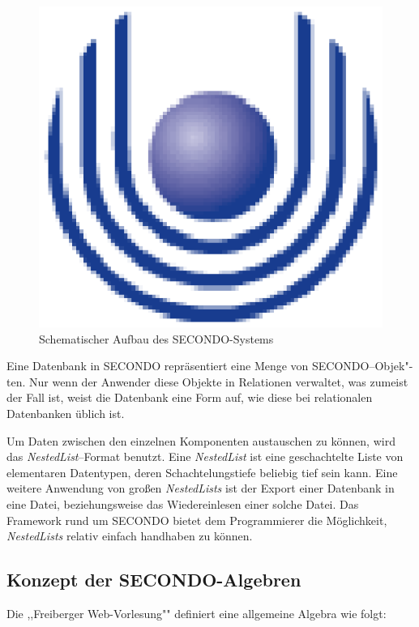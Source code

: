 \begin{figure}
	\centering
	\includegraphics{feu_logo2.eps}
	\caption{Schematischer Aufbau des SECONDO-Systems}
	\label{fig:AufbauSec}
\end{figure}

Eine Datenbank in SECONDO repräsentiert eine Menge von SECONDO--Objek"-ten. Nur wenn der Anwender diese Objekte in Relationen verwaltet, was zumeist der Fall ist, weist die Datenbank eine Form auf, wie diese bei relationalen Datenbanken üblich ist.

Um Daten zwischen den einzelnen Komponenten austauschen zu können, wird das \textit{NestedList}--Format benutzt. Eine \textit{NestedList} ist eine geschachtelte Liste von elementaren Datentypen, deren Schachtelungstiefe beliebig tief sein kann. Eine weitere Anwendung von großen \textit{NestedLists} ist der Export einer Datenbank in eine Datei, beziehungsweise das Wiedereinlesen einer solche Datei. Das Framework rund um SECONDO bietet dem Programmierer die Möglichkeit, \textit{NestedLists} relativ einfach handhaben zu können.

\subsection{Konzept der SECONDO-Algebren}

Die ,,Freiberger Web-Vorlesung"" \cite{Freib} definiert eine allgemeine Algebra wie folgt:

